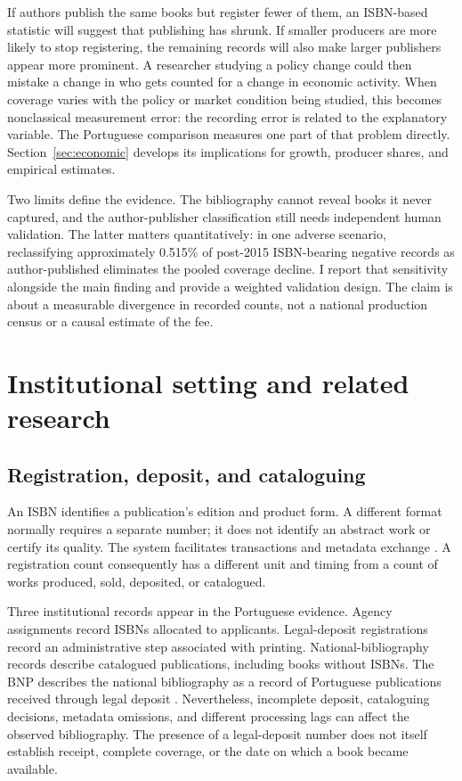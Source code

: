\documentclass[11pt]{article}
\begin{document}
If authors publish the same books but register fewer of them, an ISBN-based statistic will suggest that publishing has shrunk. If smaller producers are more likely to stop registering, the remaining records will also make larger publishers appear more prominent. A researcher studying a policy change could then mistake a change in who gets counted for a change in economic activity. When coverage varies with the policy or market condition being studied, this becomes nonclassical measurement error: the recording error is related to the explanatory variable. The Portuguese comparison measures one part of that problem directly. Section~\ref{sec:economic} develops its implications for growth, producer shares, and empirical estimates.

Two limits define the evidence. The bibliography cannot reveal books it never captured, and the author-publisher classification still needs independent human validation. The latter matters quantitatively: in one adverse scenario, reclassifying approximately 0.515\% of post-2015 ISBN-bearing negative records as author-published eliminates the pooled coverage decline. I report that sensitivity alongside the main finding and provide a weighted validation design. The claim is about a measurable divergence in recorded counts, not a national production census or a causal estimate of the fee.

\section{Institutional setting and related research}

\subsection{Registration, deposit, and cataloguing}

An ISBN identifies a publication's edition and product form. A different format normally requires a separate number; it does not identify an abstract work or certify its quality. The system facilitates transactions and metadata exchange \citep{isbnagency}. A registration count consequently has a different unit and timing from a count of works produced, sold, deposited, or catalogued.

Three institutional records appear in the Portuguese evidence. Agency assignments record ISBNs allocated to applicants. Legal-deposit registrations record an administrative step associated with printing. National-bibliography records describe catalogued publications, including books without ISBNs. The BNP describes the national bibliography as a record of Portuguese publications received through legal deposit \citep{bnpservice}. Nevertheless, incomplete deposit, cataloguing decisions, metadata omissions, and different processing lags can affect the observed bibliography. The presence of a legal-deposit number does not itself establish receipt, complete coverage, or the date on which a book became available.
\end{document}
